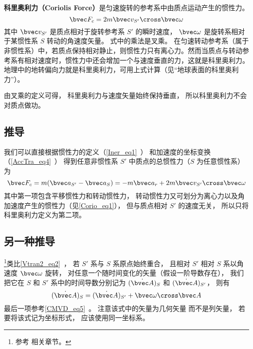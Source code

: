 

\textbf{科里奥利力（Coriolis Force）}是匀速旋转的参考系中由质点运动产生的惯性力。
\begin{equation}
\bvec F_c = 2m \bvec v_{S'} \cross \bvec \omega
\end{equation}
其中 $\bvec v_{S'}$ 是质点相对于旋转参考系 $S'$ 的瞬时速度， $\bvec\omega$ 是旋转系相对于某惯性系 $S$ 转动的角速度矢量。
式中的乘法是叉乘。
在匀速转动参考系（属于非惯性系）中，若质点保持相对静止，则惯性力只有离心力。然而当质点与转动参考系有相对速度时，惯性力中还会增加一个与速度垂直的力，这就是科里奥利力。地理中的地转偏向力就是科里奥利力，可用上式计算（见“地球表面的科里奥利力”）。

由叉乘的定义可得， 科里奥利力与速度矢量始终保持垂直， 所以科里奥利力不会对质点做功。

\subsection{推导}
我们可以直接根据惯性力的定义（\autoref{Iner_eq1}~） 和加速度的坐标变换（\autoref{AccTra_eq4}~） 得到任意非惯性系 $S'$ 中质点的总惯性力（$S$ 为任意惯性系） 为
\begin{equation}
\bvec F_c = m( \bvec a_{S'} - \bvec a_{S} ) = -m\bvec a_{r} + 2 m \bvec v_{S'} \cross  \bvec \omega
\end{equation}
其中第一项包含平移惯性力和转动惯性力， 转动惯性力又可划分为离心力以及角加速度产生的惯性力（见\autoref{Corio_eq1}）， 但与质点相对 $S'$ 的速度无关， 所以只将科里奥利力定义为第二项。

\subsection{另一种推导}\label{Corio_sub1}
\footnote{参考 \cite{Goldstein} 相关章节。}类比\autoref{Vtran2_eq2}~， 若 $S'$ 系与 $S$ 系原点始终重合， 且相对 $S'$ 相对 $S$ 系以角速度 $\bvec\omega$ 旋转， 对任意一个随时间变化的矢量（假设一阶导数存在）， 我们把它在 $S$ 和 $S'$ 系中的时间导数分别记为 $(\dot{\bvec A})_{S}$ 和 $(\dot{\bvec A})_{S'}$， 则有
\begin{equation}\label{Corio_eq4}
(\dot{\bvec A})_{S} = (\dot{\bvec A})_{S'} + \bvec\omega\cross\bvec A
\end{equation}
最后一项参考\autoref{CMVD_eq5}~。 注意该式中的矢量为几何矢量 而不是列矢量， 若要将该式记为坐标形式， 应该使用同一坐标系。

